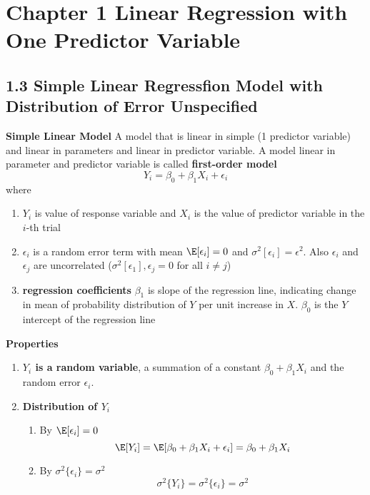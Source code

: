 \documentclass[11pt]{article}
\begin{document}
\section*{Chapter 1 Linear Regression with One Predictor Variable}

\subsection*{1.3 Simple Linear Regressfion Model with Distribution of Error Unspecified}


\begin{defn*}
    \textbf{Simple Linear Model} A model that is linear in simple (1 predictor variable) and linear in parameters and linear in predictor variable. A model linear in parameter and predictor variable is called \textbf{first-order model}
    \[
        Y_i = \beta_0 + \beta_1 X_i + \epsilon_i   
    \]
    where 
    \begin{enumerate}
        \item $Y_i$ is value of response variable and $X_i$ is the value of predictor variable in the $i$-th trial
        \item $\epsilon_i$ is a random error term with mean $\E[\epsilon_i] = 0$ and $\sigma^2[\epsilon_i] = \epsilon^2$. Also $\epsilon_i$ and $\epsilon_j$ are uncorrelated ($\sigma^2[\epsilon_1], \epsilon_j = 0$ for all $i\neq j$)
        \item \textbf{regression coefficients} $\beta_1$ is slope of the regression line, indicating change in mean of probability distribution of $Y$ per unit increase in $X$. $\beta_0$ is the $Y$ intercept of the regression line 
    \end{enumerate}
    \textbf{Properties}
    \begin{enumerate}
        \item \textbf{$Y_i$ is a random variable}, a summation of a constant $\beta_0 + \beta_1 X_i$ and the random error $\epsilon_i$. 
        \item \textbf{Distribution of $Y_i$} 
        \begin{enumerate}
            \item By $\E[\epsilon_i] = 0$ 
            \[
                \E[Y_i] = \E[\beta_0 + \beta_1 X_i + \epsilon_i] = \beta_0 + \beta_1 X_i
            \]
            \item By $\sigma^2\{\epsilon_i\} = \sigma^2$
            \[
                \sigma^2\{ Y_i \} = \sigma^2\{ \epsilon_i \} = \sigma^2
            \]
        \end{enumerate}

\end{enumerate}
\end{defn*}
\end{document}
